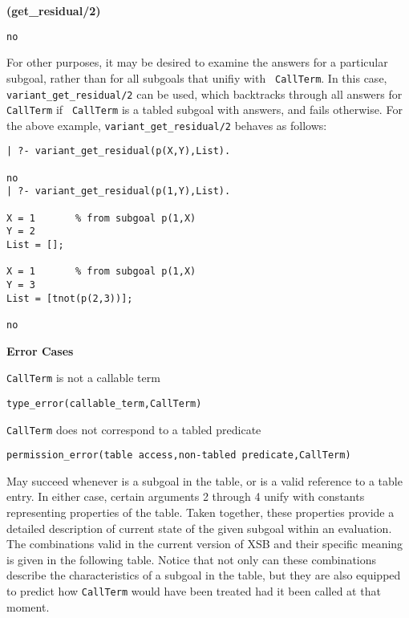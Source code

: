 \begin{description}
\begin{example}{{\bf (get\_residual/2)}}
\begin{center}
\begin{small}
\begin{verbatim}
no
\end{verbatim}
\end{small}
\end{center}
\end{example}

For other purposes, it may be desired to examine the answers for a
particular subgoal, rather than for all subgoals that unifiy with {\tt
  CallTerm}.  In this case, {\tt variant\_get\_residual/2} can be
used, which backtracks through all answers for {\tt CallTerm} if {\tt
  CallTerm} is a tabled subgoal with answers, and fails otherwise.
For the above example, {\tt variant\_get\_residual/2} behaves as
follows:

\begin{center}
\begin{small}
\begin{verbatim} 
| ?- variant_get_residual(p(X,Y),List).

no
| ?- variant_get_residual(p(1,Y),List).

X = 1       % from subgoal p(1,X)
Y = 2
List = [];

X = 1       % from subgoal p(1,X)
Y = 3
List = [tnot(p(2,3))];

no
\end{verbatim}
\end{small}
\end{center}

{\bf Error Cases}
\bi
\item {\tt CallTerm} is not a callable term
\bi
\item {\tt type\_error(callable\_term,CallTerm)}
\ei
\item {\tt CallTerm} does not correspond to a tabled predicate
\bi
\item 	{\tt permission\_error(table access,non-tabled predicate,{\tt CallTerm})}
\ei
\ei



%
May succeed whenever  is a subgoal in the table, or
 is a valid reference to a table entry.  In
either case, certain arguments 2 through 4 unify with constants
representing properties of the table.  Taken together, these
properties provide a detailed description of current state of the
given subgoal within an evaluation.  The combinations valid in the
current version of XSB and their specific meaning is given in the
following table.  Notice that not only can these combinations describe
the characteristics of a subgoal in the table, but they are also
equipped to predict how {\tt CallTerm} would have been treated had it
been called at that moment.


\end{description}

